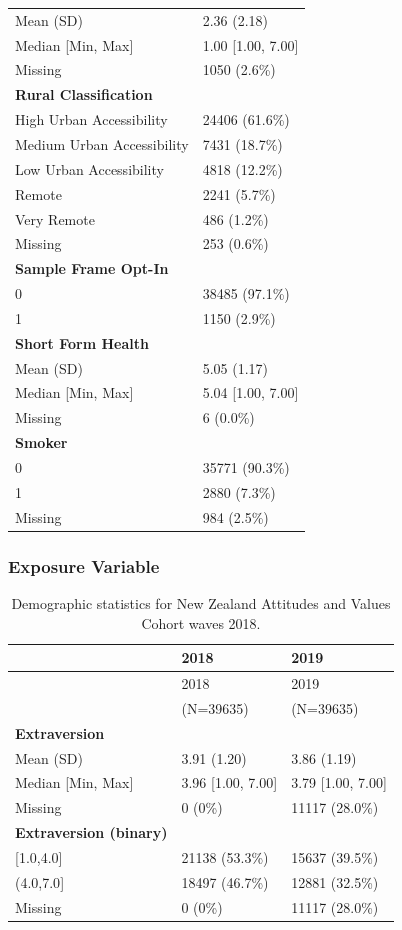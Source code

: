 \documentclass[
  single column]{article}
\begin{document}
\begin{longtable}[]{@{}ll@{}}
Mean (SD) & 2.36 (2.18) \\
Median {[}Min, Max{]} & 1.00 {[}1.00, 7.00{]} \\
Missing & 1050 (2.6\%) \\
\textbf{Rural Classification} & \\
High Urban Accessibility & 24406 (61.6\%) \\
Medium Urban Accessibility & 7431 (18.7\%) \\
Low Urban Accessibility & 4818 (12.2\%) \\
Remote & 2241 (5.7\%) \\
Very Remote & 486 (1.2\%) \\
Missing & 253 (0.6\%) \\
\textbf{Sample Frame Opt-In} & \\
0 & 38485 (97.1\%) \\
1 & 1150 (2.9\%) \\
\textbf{Short Form Health} & \\
Mean (SD) & 5.05 (1.17) \\
Median {[}Min, Max{]} & 5.04 {[}1.00, 7.00{]} \\
Missing & 6 (0.0\%) \\
\textbf{Smoker} & \\
0 & 35771 (90.3\%) \\
1 & 2880 (7.3\%) \\
Missing & 984 (2.5\%) \\
\end{longtable}

\subsubsection{Exposure Variable}\label{appendix-exposure}

\begin{longtable}[]{@{}lll@{}}
\caption{Demographic statistics for New Zealand Attitudes and Values
Cohort waves 2018.}\label{tbl-appendix-exposures}\tabularnewline
\toprule\noalign{}
& 2018 & 2019 \\
\midrule\noalign{}
\endfirsthead
\toprule\noalign{}
& 2018 & 2019 \\
\midrule\noalign{}
\endhead
\bottomrule\noalign{}
\endlastfoot
& (N=39635) & (N=39635) \\
\textbf{Extraversion} & & \\
Mean (SD) & 3.91 (1.20) & 3.86 (1.19) \\
Median {[}Min, Max{]} & 3.96 {[}1.00, 7.00{]} & 3.79 {[}1.00, 7.00{]} \\
Missing & 0 (0\%) & 11117 (28.0\%) \\
\textbf{Extraversion (binary)} & & \\
{[}1.0,4.0{]} & 21138 (53.3\%) & 15637 (39.5\%) \\
(4.0,7.0{]} & 18497 (46.7\%) & 12881 (32.5\%) \\
Missing & 0 (0\%) & 11117 (28.0\%) \\
\end{longtable}
\end{document}
